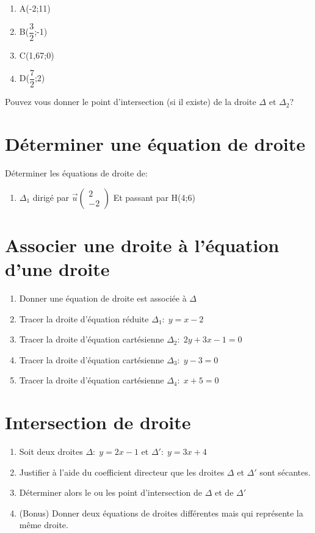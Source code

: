\documentclass[french]{book}
\begin{document}
\begin{enumerate}
\item A(-2;11)
\item B($\dfrac{3}{2}$;-1)
\item C(1,67;0)
\item D($\dfrac{7}{2}$;2)
\end{enumerate}

Pouvez vous donner le point d'intersection (si il existe) de la droite $\Delta$ et $\Delta_2$?

\section*{Déterminer une équation de droite}
Déterminer les équations de droite de: 
\begin{enumerate}
\item $\Delta_1$ dirigé par  $\overrightarrow{u} \left( \begin{array}{c} 2 \\ -2 \end{array} \right)$  Et passant par H(4;6)
\end{enumerate}


\section*{Associer une droite à l'équation d'une droite}
\begin{enumerate}
\item Donner une équation de droite est associée à $\Delta$
\item Tracer la droite d'équation réduite $\Delta_1: \; y = x-2$
\item Tracer la droite d'équation cartésienne  $\Delta_2: \; 2y+3x-1=0$
\item Tracer la droite d'équation cartésienne $\Delta_3: \; y-3=0$
\item Tracer la droite d'équation cartésienne $\Delta_4: \; x+5=0$
\end{enumerate}

\section*{Intersection de droite}
\begin{enumerate}
\item Soit deux droites $\Delta: \;  y=2x-1$ et $\Delta': \; y=3x+4$
\item Justifier à l'aide du coefficient directeur que les droites $\Delta$ et $\Delta'$ sont sécantes.
\item Déterminer alors le ou les point d'intersection de $\Delta$ et de $\Delta'$
\item (Bonus) Donner deux équations de droites différentes mais qui représente la même droite.
\end{enumerate}
\end{document}
